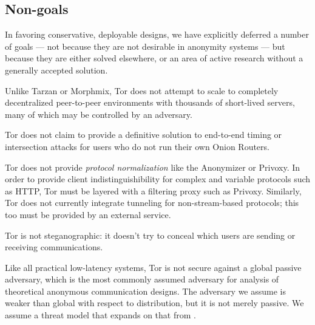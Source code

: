 \documentclass[times,10pt,twocolumn]{article}
\begin{document}
\subsection{Non-goals}
In favoring conservative, deployable designs, we have explicitly
deferred a number of goals --- not because they are not desirable in
anonymity systems --- but because they are either solved
elsewhere, or an area of active research without a generally accepted
solution.

Unlike Tarzan or Morphmix, Tor does not attempt to scale to completely
decentralized peer-to-peer environments with thousands of short-lived
servers, many of which may be controlled by an adversary.

Tor does not claim to provide a definitive solution to end-to-end
timing or intersection attacks for users who do not run their own
Onion Routers.

Tor does not provide \emph{protocol normalization} like the Anonymizer or
Privoxy.  In order to provide client indistinguishibility for
complex and variable protocols such as HTTP, Tor must be layered with
a filtering proxy such as Privoxy.  Similarly, Tor does not currently
integrate tunneling for non-stream-based protocols; this too must be
provided by an external service.

Tor is not steganographic: it doesn't try to conceal which users are
sending or receiving communications.


\label{subsec:adversary-model}

Like all practical low-latency systems, Tor is not secure against a
global passive adversary, which is the most commonly assumed adversary
for analysis of theoretical anonymous communication designs. The adversary
we assume
is weaker than global with respect to distribution, but it is not
merely passive.
We assume a threat model that expands on that from \cite{or-pet00}.
\end{document}
